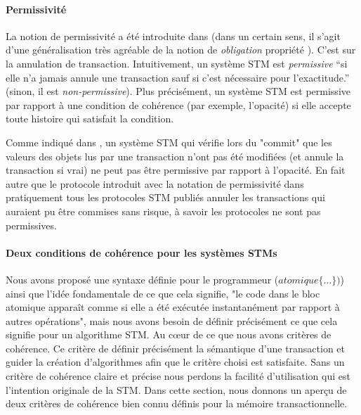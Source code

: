 \paragraph{Permissivité}
La notion de permissivité a été introduite dans \cite{GHS08} (dans un certain sens,
il s'agit d'une généralisation très agréable de la notion de {\it obligation} propriété \cite{a-IR09}). C'est sur la annulation de transaction.
Intuitivement, un système STM est {\it permissive} ``si elle n'a jamais annule une transaction sauf si c'est nécessaire pour l'exactitude.''
(sinon, il est {\it non-permissive}). Plus précisément, un système STM est permissive par rapport à une condition de cohérence
(par exemple, l'opacité) si elle accepte toute histoire qui satisfait la condition.

Comme indiqué dans \cite{GHS08}, un système STM qui vérifie lors du "commit" que les
valeurs des objets lus par une transaction n'ont pas été modifiées (et annule la transaction si vrai) ne peut pas être permissive par rapport à l'opacité.
En fait autre que le protocole introduit avec la notation de permissivité dans \cite{GHS08} pratiquement
tous les protocoles STM publiés annuler les transactions qui auraient pu être commises sans risque, à savoir les protocoles ne sont pas permissives.


\paragraph{Deux conditions de cohérence pour les systèmes STMs}
Nous avons proposé une syntaxe définie pour le programmeur ($atomique \{ \dots \})$) ainsi que l'idée fondamentale de ce que cela signifie,
"le code dans le bloc atomique apparaît comme si elle a été exécutée instantanément par rapport à autres opérations",
mais nous avons besoin de définir précisément ce que cela signifie pour un algorithme STM.
Au cœur de ce que nous avons critères de cohérence.
Ce critère de définir précisément la sémantique d'une transaction et guider la création d'algorithmes afin que le critère choisi est satisfaite.
Sans un critère de cohérence claire et précise nous perdons la facilité d'utilisation qui est l'intention originale de la STM.
Dans cette section, nous donnons un aperçu de deux critères de cohérence bien connu définis pour la mémoire transactionnelle.




